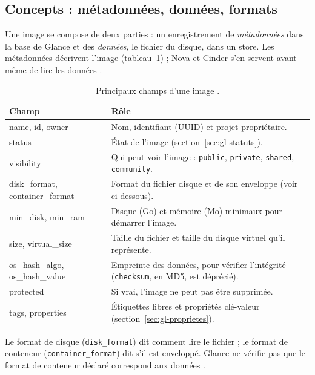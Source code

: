 \subsection{Concepts : métadonnées, données, formats}\label{sec:gl-concepts}

Une \gls{image} se compose de deux parties : un enregistrement de \emph{métadonnées} dans la base de Glance et des
\emph{données}, le fichier du disque, dans un \gls{store}. Les métadonnées décrivent l'image
(tableau~\ref{tab:gl-champs}) ; Nova et Cinder s'en servent avant même de lire les données
\parencite{glance-api-ref}.

\begin{table}[!ht]
\centering
\renewcommand{\arraystretch}{1.3}
\begin{tabular}{@{}>{\raggedright\arraybackslash\ttfamily}p{3.6cm}>{\raggedright\arraybackslash}p{11.9cm}@{}}
\toprule
\textrm{\textbf{Champ}} & \textbf{Rôle} \\
\midrule
name, id, owner & Nom, identifiant (UUID) et projet propriétaire. \\
status & État de l'image (section~\ref{sec:gl-statuts}). \\
visibility & Qui peut voir l'image : \texttt{public}, \texttt{private}, \texttt{shared}, \texttt{community}. \\
disk\_format, container\_format & Format du fichier disque et de son enveloppe (voir ci-dessous). \\
min\_disk, min\_ram & Disque (Go) et mémoire (Mo) minimaux pour démarrer l'image. \\
size, virtual\_size & Taille du fichier et taille du disque virtuel qu'il représente. \\
os\_hash\_algo, os\_hash\_value & Empreinte des données, pour vérifier l'intégrité (\texttt{checksum}, en MD5, est déprécié). \\
protected & Si vrai, l'image ne peut pas être supprimée. \\
tags, properties & Étiquettes libres et propriétés clé-valeur (section~\ref{sec:gl-proprietes}). \\
\bottomrule
\end{tabular}
\caption{Principaux champs d'une image \parencite{glance-api-ref}.}
\label{tab:gl-champs}
\end{table}

Le format de disque (\texttt{disk\_\allowbreak format}) dit comment lire le fichier ; le format de conteneur
(\texttt{container\_\allowbreak format}) dit s'il est enveloppé. Glance ne vérifie pas que le format de conteneur déclaré
correspond aux données \parencite{glance-formats}.

